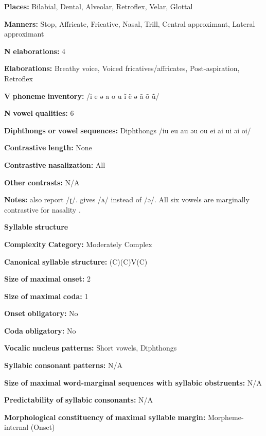 \textbf{Places:} Bilabial, Dental, Alveolar, Retroflex, Velar, Glottal

\textbf{Manners:} Stop, Affricate, Fricative, Nasal, Trill, Central approximant, Lateral approximant

\textbf{N} \textbf{elaborations:} 4

\textbf{Elaborations:} Breathy voice, Voiced fricatives/affricates, Post-aspiration, Retroflex

\textbf{V} \textbf{phoneme} \textbf{inventory:} /i e ə a o u ĩ ẽ ə ã õ ũ/

\textbf{N} \textbf{vowel} \textbf{qualities:} 6

\textbf{Diphthongs} \textbf{or} \textbf{vowel} \textbf{sequences:} Diphthongs /iu eu au əu ou ei ai ui əi oi/

\textbf{Contrastive} \textbf{length:} None

\textbf{Contrastive} \textbf{nasalization:} All

\textbf{Other} \textbf{contrasts:} N/A

\textbf{Notes:} \citet{KotapishKotapish1973} also report /ɽ/. \citet{Paudyal2003} gives /ʌ/ instead of /ə/. All six vowels are marginally contrastive for nasality \citep[7]{Dhakal2012}.

\textbf{Syllable} \textbf{structure}

\textbf{Complexity} \textbf{Category:} Moderately Complex

\textbf{Canonical} \textbf{syllable} \textbf{structure:} (C)(C)V(C) \citep[17-20]{Dhakal2012}

\textbf{Size} \textbf{of} \textbf{maximal} \textbf{onset:} 2

\textbf{Size} \textbf{of} \textbf{maximal} \textbf{coda:} 1

\textbf{Onset} \textbf{obligatory:} No

\textbf{Coda} \textbf{obligatory:} No

\textbf{Vocalic} \textbf{nucleus} \textbf{patterns:} Short vowels, Diphthongs

\textbf{Syllabic} \textbf{consonant} \textbf{patterns:} N/A

\textbf{Size} \textbf{of} \textbf{maximal} \textbf{word{}-marginal sequences with syllabic obstruents:} N/A

\textbf{Predictability} \textbf{of} \textbf{syllabic} \textbf{consonants:} N/A

\textbf{Morphological} \textbf{constituency} \textbf{of} \textbf{maximal} \textbf{syllable} \textbf{margin:} Morpheme-internal (Onset)

